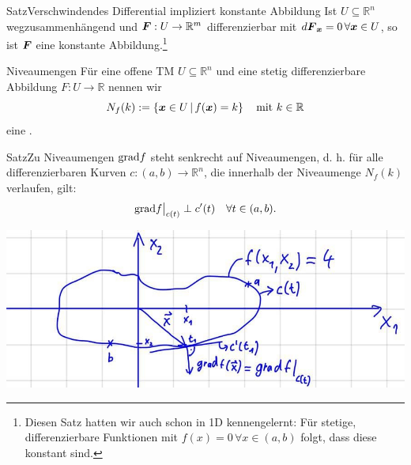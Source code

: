 \begin{Satz}
{Satz}{Verschwindendes Differential impliziert konstante Abbildung}
Ist $U\subseteq\mathbb{R}^n$ wegzusammenhängend und ${{\text{\boldmath${F}$}}}:U\to\mathbb{R}^m$ differenzierbar mit $d{{\text{\boldmath${F}$}}}_{{\text{\boldmath${x}$}}}=0\,\forall{{\text{\boldmath${x}$}}}\in U$, so ist ${{\text{\boldmath${F}$}}}$ eine konstante Abbildung.\footnote{Diesen Satz hatten wir auch schon in 1D kennengelernt: Für stetige, differenzierbare Funktionen mit $f(x)=0\,\forall x\in (a,b)$ folgt, dass diese konstant sind.}
\end{Satz}
\begin{Def}
{Niveaumengen}
Für eine offene TM $U\subseteq\mathbb{R}^n$ und eine stetig differenzierbare Abbildung $F:U\to\mathbb{R}$ nennen wir
\begin{equation}
    N_f(k):=\left\{{{\text{\boldmath${x}$}}}\in U\,|\, f({{\text{\boldmath${x}$}}})=k\right\}\quad\text{mit } k\in\mathbb{R}
\end{equation}
eine .\\
\end{Def}
\begin{Satz}
{Satz}{Zu Niveaumengen}
$\text{grad} f$ steht senkrecht auf Niveaumengen, d. h. für alle differenzierbaren Kurven $c:(a,b)\to\mathbb{R}^n$, die innerhalb der Niveaumenge $N_f(k)$ verlaufen, gilt:
\begin{equation}
    \text{grad} f\big|_{c(t)}\perp c'(t)\quad \forall t\in (a,b).
\end{equation}
\begin{center}
    \includegraphics[width=.5\textwidth]{Dateien/08/08Aequipotential.jpg}
\end{center}
\end{Satz}
